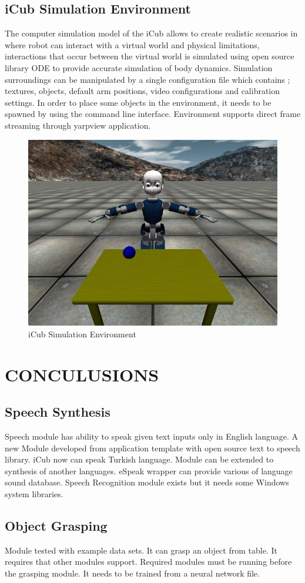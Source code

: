 \documentclass[a4paper, 11pt]{report}
\begin{document}
\section{iCub Simulation Environment}
The computer simulation model of the iCub allows to create realistic scenarios 
in where robot can interact with a virtual world and physical limitations, 
interactions that occur between the virtual world is simulated using open 
source library ODE to provide accurate simulation of body dynamics.
Simulation surroundings can be manipulated by a single configuration file which 
contains ; textures, objects, default arm positions, video configurations and 
calibration settings. In order to place some objects in the environment, it 
needs to be spawned by using the command line interface. Environment supports 
direct frame streaming through yarpview application.
\begin{figure}[h!]
\centering
\includegraphics[width=0.5\linewidth]{sim}
\caption{iCub Simulation Environment}
\label{fig:icub}
\end{figure}
\chapter{CONCULUSIONS}
\section{Speech Synthesis}
Speech module has ability to speak given text inputs only in English language. 
A new Module developed from application template with open source text to 
speech library. iCub now can speak Turkish language. Module can be extended to 
synthesis of another languages. eSpeak wrapper can provide various of language 
sound database. Speech Recognition module exists but it needs some Windows 
system libraries.
\section{Object Grasping}
Module tested with example data sets. It can grasp an object from table. It 
requires that other modules support. Required modules must be running before 
the grasping module. It needs to be trained from a neural network file.
\end{document}
